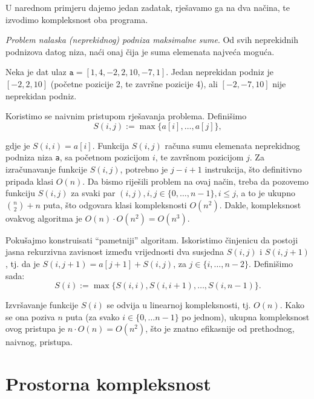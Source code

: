 U narednom primjeru dajemo jedan zadatak, rješavamo ga na dva načina, te izvodimo kompleksnost oba programa.

\begin{example}
 \textit{{Problem nalaska (neprekidnog) podniza  maksimalne sume}}.  Od svih neprekidnih podnizova datog
 niza, naći onaj čija je suma elemenata najveća moguća. 
\end{example}
\begin{solution}
 
 Neka je dat ulaz $\texttt{a} = [1, 4, -2, 2, 10, -7, 1]$.  Jedan neprekidan podniz je $[ -2, 2, 10 ]$ (početne pozicije 2, te završne pozicije 4), ali $[-2, -7, 10]$ nije neprekidan podniz. 
 
Koristimo se naivnim pristupom rješavanja problema. Definišimo $$S(i, j) := \max  \{ a[i], \ldots, a[j] \},$$

gdje je $S(i, i ) = a[i]$. 
Funkcija $S(i,j)$ računa sumu elemenata neprekidnog podniza niza \texttt{a}, sa početnom pozicijom  $i$, te završnom pozicijom $j$.
Za izračunavanje funkcije $S(i, j)$, potrebno je $j-i+1$ instrukcija, što definitivno pripada klasi $O(n)$. Da bismo riješili problem na ovaj način, 
treba da pozovemo funkciju $S(i,j)$ za svaki par $(i,j),  {i, j \in \{0, \ldots , n-1\},  i \leq j}$, a to je ukupno $\binom{n}{2} + n$ puta, što odgovara klasi kompleksnosti $O(n^2)$. Dakle, kompleksnost ovakvog algoritma je $O(n)\cdot O(n^2) = O(n^3)$. 

Pokušajmo konstruisati ``pametniji'' algoritam. Iskoristimo činjenicu da postoji jasna rekurzivna zavisnost između vrijednosti dva susjedna $S(i,j)$ i $S(i, j+1)$, tj. da je $S(i, j+1) = a[j+1] + S(i, j)$, za $j \in \{i, \ldots, n-2\}$. Definišimo sada:
$$ S(i):= \max \{ S(i, i), S(i, i+1), \ldots, S(i, n-1)\}.$$

Izvršavanje funkcije $S(i)$ se odvija u linearnoj kompleksnosti, tj. $O(n)$. Kako se ona poziva $n$ puta (za svako $i \in \{0, \ldots n-1\}$ po jednom), ukupna kompleksnost ovog pristupa je $n \cdot O(n) = O(n^2)$, što je znatno efikasnije od prethodnog, naivnog, pristupa. 
 

\end{solution}



 
 
 \section{Prostorna kompleksnost}
 
